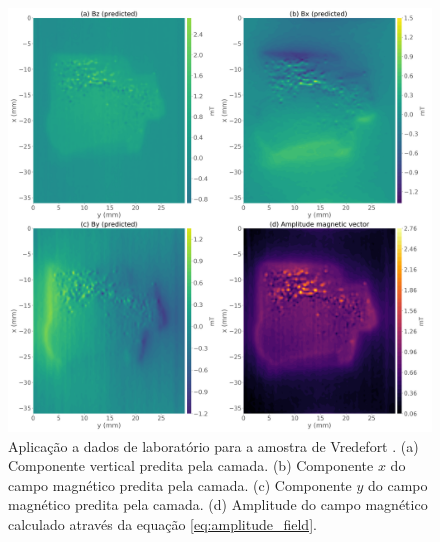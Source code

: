 \begin{figure}
	\centering
	\includegraphics[width=1.\textwidth]{Fig/mag_vec/aplicacao_vredefort/field_components_eqlayer.png}
	\caption{Aplicação a dados de laboratório para a amostra de Vredefort \citep{araujo_etal2019_materials}. (a) Componente vertical predita pela camada. (b) Componente $x$ do campo magnético predita pela camada. (c) Componente $y$ do campo magnético predita pela camada. (d) Amplitude do campo magnético calculado através da equação \ref{eq:amplitude_field}.}
	\label{fig:components_real_sample}
\end{figure}


